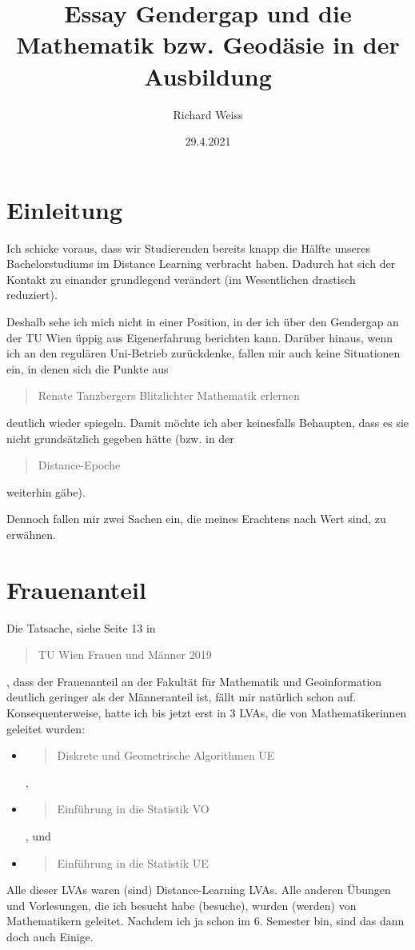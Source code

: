 \documentclass{article}
\title{Essay Gendergap und die Mathematik bzw. Geodäsie in der Ausbildung}
\author{Richard Weiss}
\date{29.4.2021}
\begin{document}
\maketitle

\section*{Einleitung}

Ich schicke voraus, dass wir Studierenden bereits knapp die Hälfte unseres Bachelorstudiums im Distance Learning verbracht haben.
Dadurch hat sich der Kontakt zu einander grundlegend verändert (im Wesentlichen drastisch reduziert).

Deshalb sehe ich mich nicht in einer Position, in der ich über den Gendergap an der TU Wien üppig aus Eigenerfahrung berichten kann.
Darüber hinaus, wenn ich an den regulären Uni-Betrieb zurückdenke, fallen mir auch keine Situationen ein, in denen sich die Punkte aus \blockquote{Renate Tanzbergers Blitzlichter Mathematik erlernen} deutlich wieder spiegeln.
Damit möchte ich aber keinesfalls Behaupten, dass es sie nicht grundsätzlich gegeben hätte (bzw. in der \blockquote{Distance-Epoche} weiterhin gäbe).

Dennoch fallen mir zwei Sachen ein, die meines Erachtens nach Wert sind, zu erwähnen.

\section*{Frauenanteil}

Die Tatsache, siehe Seite 13 in \blockquote{TU Wien Frauen und Männer 2019}, dass der Frauenanteil an der Fakultät für Mathematik und Geoinformation deutlich geringer als der Männeranteil ist, fällt mir natürlich schon auf.
Konsequenterweise, hatte ich bis jetzt erst in 3 LVAs, die von Mathematikerinnen geleitet wurden:

\begin{itemize}
	\item \blockquote{Diskrete und Geometrische Algorithmen UE},
	\item \blockquote{Einführung in die Statistik VO}, und
	\item \blockquote{Einführung in die Statistik UE}.
\end{itemize}

Alle dieser LVAs waren (sind) Distance-Learning LVAs.
Alle anderen Übungen und Vorlesungen, die ich besucht habe (besuche), wurden (werden) von Mathematikern geleitet.
Nachdem ich ja schon im 6. Semester bin, sind das dann doch auch Einige.
\end{document}
